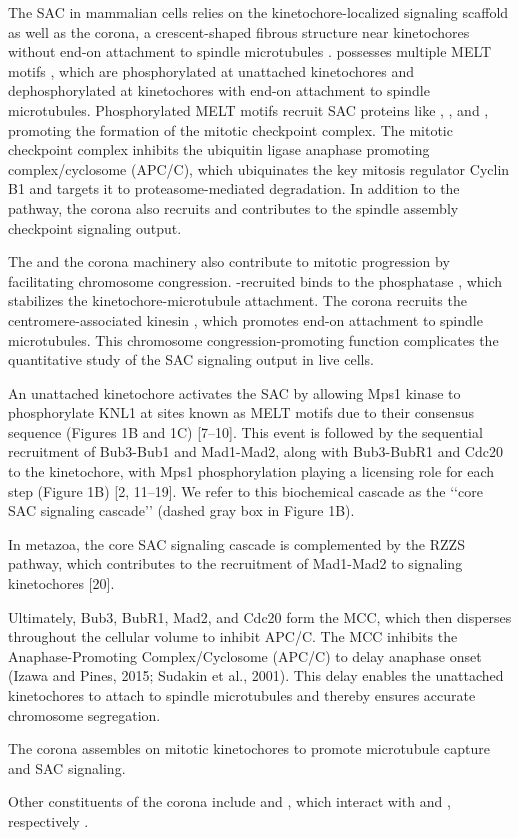The SAC in mammalian cells relies on the kinetochore-localized signaling scaffold  as well as the corona, a crescent-shaped fibrous structure near kinetochores without end-on attachment to spindle microtubules \cite{GSK923295LateralAttachmentEM,CoronaActivatesSAC}.  possesses multiple MELT motifs \cite{MELTEvolution}, which are phosphorylated at unattached kinetochores and dephosphorylated at kinetochores with end-on attachment to spindle microtubules. Phosphorylated MELT motifs recruit SAC proteins like , , and , promoting the formation of the mitotic checkpoint complex. The mitotic checkpoint complex inhibits the ubiquitin ligase anaphase promoting complex/cyclosome (APC/C), which ubiquinates the key mitosis regulator Cyclin B1 and targets it to proteasome-mediated degradation. In addition to the  pathway, the corona also recruits  and contributes to the spindle assembly checkpoint signaling output.

The  and the corona machinery also contribute to mitotic progression by facilitating chromosome congression. -recruited  binds to the phosphatase , which stabilizes the kinetochore-microtubule attachment. The corona recruits the centromere-associated kinesin , which promotes end-on attachment to spindle microtubules. This chromosome congression-promoting function complicates the quantitative study of the SAC signaling output in live cells.

An unattached kinetochore activates the SAC by allowing Mps1 kinase to phosphorylate KNL1 at sites known as MELT motifs due to their consensus sequence (Figures 1B and 1C) [7–10]. This event is followed by the sequential recruitment of Bub3-Bub1 and Mad1-Mad2, along with Bub3-BubR1 and Cdc20 to the kinetochore, with Mps1 phosphorylation playing a licensing role for each step (Figure 1B) [2, 11–19]. We refer to this biochemical cascade as the ‘‘core SAC signaling cascade’’ (dashed gray box in Figure 1B).

In metazoa, the core SAC signaling cascade is complemented by the RZZS pathway, which contributes to the recruitment of Mad1-Mad2 to signaling kinetochores [20].

Ultimately, Bub3, BubR1, Mad2, and Cdc20 form the MCC, which then disperses throughout the cellular volume to inhibit APC/C. The MCC inhibits the Anaphase-Promoting Complex/Cyclosome (APC/C) to delay anaphase onset (Izawa and Pines, 2015; Sudakin et al., 2001). This delay enables the unattached kinetochores to attach to spindle microtubules and thereby ensures accurate chromosome segregation.

The corona assembles on mitotic kinetochores to promote microtubule capture and SAC signaling.

Other constituents of the corona include  and , which interact with  and , respectively \cite{CENPELocalization-BUBR1, CENP-FLimitsStripping}.
